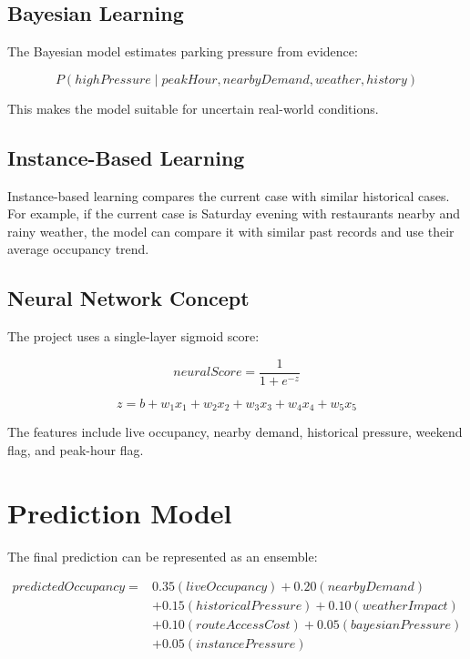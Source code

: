 \documentclass[12pt,a4paper]{article}
\begin{document}
\subsection{Bayesian Learning}

The Bayesian model estimates parking pressure from evidence:

\begin{equation}
  P(highPressure \mid peakHour, nearbyDemand, weather, history)
\end{equation}

This makes the model suitable for uncertain real-world conditions.

\subsection{Instance-Based Learning}

Instance-based learning compares the current case with similar historical cases. For example, if the current case is Saturday evening with restaurants nearby and rainy weather, the model can compare it with similar past records and use their average occupancy trend.

\subsection{Neural Network Concept}

The project uses a single-layer sigmoid score:

\begin{equation}
  neuralScore = \frac{1}{1 + e^{-z}}
\end{equation}

\begin{equation}
  z = b + w_1x_1 + w_2x_2 + w_3x_3 + w_4x_4 + w_5x_5
\end{equation}

The features include live occupancy, nearby demand, historical pressure, weekend flag, and peak-hour flag.

\section{Prediction Model}
\label{sec:prediction-model}

The final prediction can be represented as an ensemble:

\begin{equation}
\begin{split}
predictedOccupancy ={}& 0.35(liveOccupancy) + 0.20(nearbyDemand)\\
&+ 0.15(historicalPressure) + 0.10(weatherImpact)\\
&+ 0.10(routeAccessCost) + 0.05(bayesianPressure)\\
&+ 0.05(instancePressure)
\end{split}
\end{equation}
\end{document}
